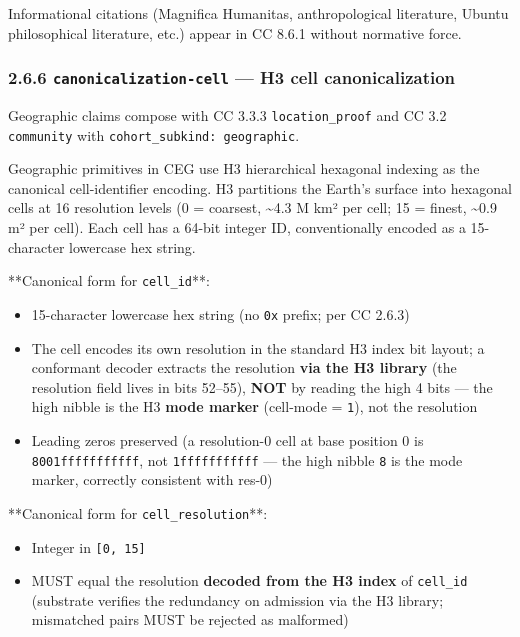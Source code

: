 \documentclass[11pt]{article}
\begin{document}
Informational citations (Magnifica Humanitas, anthropological literature, Ubuntu philosophical literature, etc.) appear in CC 8.6.1 without normative force.


\subsubsection*{2.6.6 \texttt{canonicalization-cell} — H3 cell canonicalization}


Geographic claims compose with CC 3.3.3 \texttt{location\_proof} and CC 3.2 \texttt{community} with \texttt{cohort\_subkind: geographic}.


Geographic primitives in CEG use H3 hierarchical hexagonal indexing as the canonical cell-identifier encoding. H3 partitions the Earth's surface into hexagonal cells at 16 resolution levels (0 = coarsest, \textasciitilde{}4.3 M km² per cell; 15 = finest, \textasciitilde{}0.9 m² per cell). Each cell has a 64-bit integer ID, conventionally encoded as a 15-character lowercase hex string.


**Canonical form for \texttt{cell\_id}**:


\begin{itemize}\setlength\itemsep{0pt}
\item 15-character lowercase hex string (no \texttt{0x} prefix; per CC 2.6.3)
\item The cell encodes its own resolution in the standard H3 index bit layout; a conformant decoder extracts the resolution \textbf{via the H3 library} (the resolution field lives in bits 52–55), \textbf{NOT} by reading the high 4 bits — the high nibble is the H3 \textbf{mode marker} (cell-mode = \texttt{1}), not the resolution
\item Leading zeros preserved (a resolution-0 cell at base position 0 is \texttt{8001fffffffffff}, not \texttt{1fffffffffff} — the high nibble \texttt{8} is the mode marker, correctly consistent with res-0)
\end{itemize}


**Canonical form for \texttt{cell\_resolution}**:


\begin{itemize}\setlength\itemsep{0pt}
\item Integer in \texttt{[0, 15]}
\item MUST equal the resolution \textbf{decoded from the H3 index} of \texttt{cell\_id} (substrate verifies the redundancy on admission via the H3 library; mismatched pairs MUST be rejected as malformed)
\end{itemize}
\end{document}
